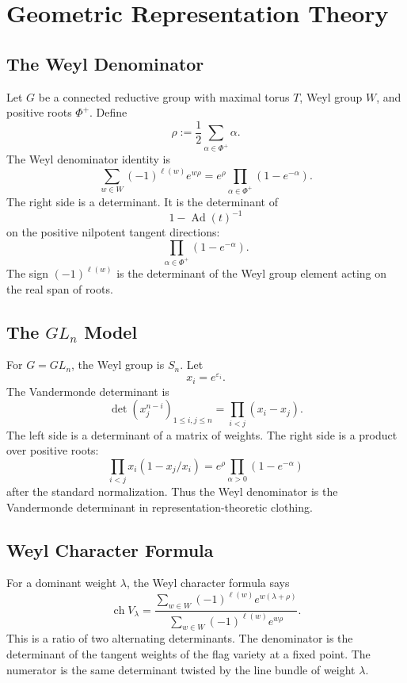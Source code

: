 \documentclass[11pt]{memoir}
\begin{document}
\chapter{Geometric Representation Theory}
\label{ch:grt}

\section{The Weyl Denominator}
\label{sec:weyl-denominator}

Let \(G\) be a connected reductive group with maximal torus \(T\), Weyl
group \(W\), and positive roots \(\Phi^+\). Define
\[
  \rho:=\frac12\sum_{\alpha\in\Phi^+}\alpha.
\]
The Weyl denominator identity is
\[
  \sum_{w\in W}(-1)^{\ell(w)}e^{w\rho}
  =
  e^\rho\prod_{\alpha\in\Phi^+}(1-e^{-\alpha}).
\]
The right side is a determinant. It is the determinant of
\[
  1-\operatorname{Ad}(t)^{-1}
\]
on the positive nilpotent tangent directions:
\[
  \prod_{\alpha\in\Phi^+}(1-e^{-\alpha}).
\]
The sign \((-1)^{\ell(w)}\) is the determinant of the Weyl group
element acting on the real span of roots.

\section{\texorpdfstring{The \(GL_n\) Model}{The GLn Model}}
\label{sec:gln-model}

For \(G=GL_n\), the Weyl group is \(S_n\). Let
\[
  x_i=e^{\varepsilon_i}.
\]
The Vandermonde determinant is
\[
  \det(x_j^{n-i})_{1\leq i,j\leq n}
  =
  \prod_{i<j}(x_i-x_j).
\]
The left side is a determinant of a matrix of weights. The right side
is a product over positive roots:
\[
  \prod_{i<j}x_i(1-x_j/x_i)
  =
  e^\rho\prod_{\alpha>0}(1-e^{-\alpha})
\]
after the standard normalization. Thus the Weyl denominator is the
Vandermonde determinant in representation-theoretic clothing.

\section{Weyl Character Formula}
\label{sec:weyl-character}

For a dominant weight \(\lambda\), the Weyl character formula says
\[
  \operatorname{ch}V_\lambda
  =
  \frac{\sum_{w\in W}(-1)^{\ell(w)}e^{w(\lambda+\rho)}}
  {\sum_{w\in W}(-1)^{\ell(w)}e^{w\rho}}.
\]
This is a ratio of two alternating determinants. The denominator is
the determinant of the tangent weights of the flag variety at a fixed
point. The numerator is the same determinant twisted by the line
bundle of weight \(\lambda\).
\end{document}

